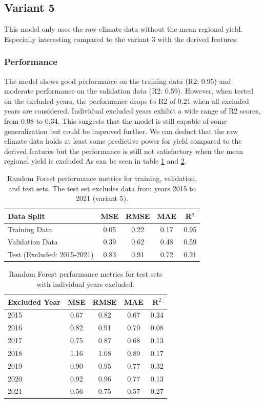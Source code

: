 \documentclass{article}
\begin{document}
\subsection{Variant 5}
This model only uses the raw climate data without the mean regional yield. Especially interesting compared to the variant 3 with the derived features.
\subsubsection{Performance}
The model shows good performance on the training data (R2: 0.95) and moderate performance on the validation data (R2: 0.59). However, when tested on the excluded years, the performance drops to R2 of 0.21 when all excluded years are considered.  Individual excluded years exhibit a wide range of R2 scores, from 0.08 to 0.34.  This suggests that the model is still capable of some generalization but could be improved further.
We can deduct that the raw climate data holds at least some predictive power for yield compared to the derived features but the performance is still not satisfactory when the mean regional yield is excluded
As can be seen in table \ref{table:errors_on_datasets_variant_5} and \ref{table:errors_on_datasets_years_variant_5}.
\begin{table}[H]
	\centering
	\begin{tabular}{lcccc}
		\hline
		Data Split                 & MSE  & RMSE & MAE  & R$^2$ \\
		\hline
		Training Data              & 0.05 & 0.22 & 0.17 & 0.95  \\
		Validation Data            & 0.39 & 0.62 & 0.48 & 0.59  \\
		Test (Excluded: 2015-2021) & 0.83 & 0.91 & 0.72 & 0.21  \\
		\hline
	\end{tabular}
	\caption{\label{table:errors_on_datasets_variant_5} Random Forest performance metrics for training, validation, and test sets. The test set excludes data from years 2015 to 2021 (variant 5).}
\end{table}

\begin{table}[H]
	\centering
	\begin{tabular}{lcccc}
		\hline
		Excluded Year & MSE  & RMSE & MAE  & R$^2$ \\
		\hline
		2015          & 0.67 & 0.82 & 0.67 & 0.34  \\
		2016          & 0.82 & 0.91 & 0.70 & 0.08  \\
		2017          & 0.75 & 0.87 & 0.68 & 0.13  \\
		2018          & 1.16 & 1.08 & 0.89 & 0.17  \\
		2019          & 0.90 & 0.95 & 0.77 & 0.32  \\
		2020          & 0.92 & 0.96 & 0.77 & 0.13  \\
		2021          & 0.56 & 0.75 & 0.57 & 0.27  \\
		\hline
	\end{tabular}
	\caption{\label{table:errors_on_datasets_years_variant_5} Random Forest performance metrics for test sets with individual years excluded.}
\end{table}
\end{document}
